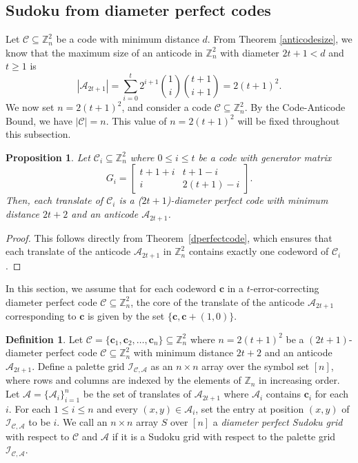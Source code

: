 \documentclass{article}
\newtheorem{prop}[theorem]{Proposition}
\theoremstyle{definition}
\newtheorem{definition}{Definition}[section]
\begin{document}
\subsection{Sudoku from diameter perfect codes}
Let $\mathcal{C}\subseteq\mathbb{Z}_n^2$ be a code with minimum distance $d$. From Theorem \ref{anticodesize}, we know that the maximum size of an anticode in $\mathbb{Z}_n^2$ with diameter $2t+1<d$ and $t\ge 1$ is
\[
|\mathcal{A}_{2t+1}|=\sum_{i=0}^t2^{i+1}{\binom{1}{i}}{\binom{t+1}{i+1}}=2(t+1)^2.
\]
We now set $n=2(t+1)^2$, and consider a code $\mathcal{C}\subseteq\mathbb{Z}_n^2$. By the Code-Anticode Bound, we have $|\mathcal{C}|=n$. This value of $n=2(t+1)^2$ will be fixed throughout this subsection.

\begin{prop}
Let $\mathcal{C}_i\subseteq\mathbb{Z}_n^2$ where $0\le i\le t$ be a code with generator matrix
\[
G_i=\begin{bmatrix} t+1+i & t+1-i\\i & 2(t+1)-i\end{bmatrix}.
\]
Then, each translate of $\mathcal{C}_i$ is a ($2t+1$)-diameter perfect code with minimum distance $2t+2$ and an anticode $\mathcal{A}_{2t+1}$.
\end{prop}
\begin{proof}
This follows directly from Theorem~\ref{dperfectcode}, which ensures that each translate of the anticode $\mathcal{A}_{2t+1}$ in $\mathbb{Z}_n^2$ contains exactly one codeword of $\mathcal{C}_i$.
\end{proof}

In this section, we assume that for each codeword $\mathbf{c}$ in a $t$-error-correcting diameter perfect code $\mathcal{C} \subseteq \mathbb{Z}_n^2$, the core of the translate of the anticode $\mathcal{A}_{2t+1}$ corresponding to $\mathbf{c}$ is given by the set $\{\mathbf{c}, \mathbf{c}+(1, 0)\}$.

\begin{definition}
    Let $\mathcal{C}=\{\mathbf{c}_1, \mathbf{c}_2, \ldots, \mathbf{c}_n\}\subseteq\mathbb{Z}_n^2$ where $n=2(t+1)^2$ be a $(2t+1)$-diameter perfect code $\mathcal{C}\subseteq\mathbb{Z}_n^2$ with minimum distance $2t+2$ and an anticode $\mathcal{A}_{2t+1}$. Define a palette grid $\mathcal{I}_{\mathcal{C}, \mathcal{A}}$ as an $n\times n$ array over the symbol set $[n]$, where rows and columns are indexed by the elements of $\mathbb{Z}_n$ in increasing order. Let $\mathcal{A}=\{\mathcal{A}_i\}_{i=1}^n$ be the set of translates of $\mathcal{A}_{2t+1}$ where $\mathcal{A}_i$ contains $\mathbf{c}_i$ for each $i$. For each $1\le i\le n$ and every $(x, y)\in\mathcal{A}_i$, set the entry at position $(x, y)$ of $\mathcal{I}_{\mathcal{C}, \mathcal{A}}$ to be $i$. We call an $n\times n$ array $S$ over $[n]$ a \textit{diameter perfect Sudoku grid} with respect to $\mathcal{C}$ and $\mathcal{A}$ if it is a Sudoku grid with respect to the palette grid $\mathcal{I}_{\mathcal{C}, \mathcal{A}}$.
\end{definition}
\end{document}
